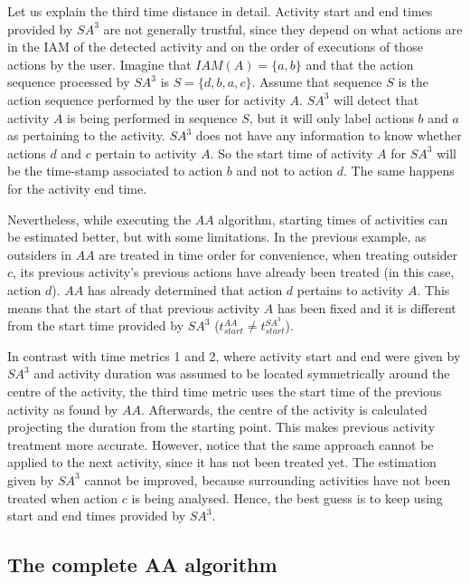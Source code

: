 Let us explain the third time distance in detail. Activity start and end times provided by $SA^3$ are not generally trustful, since they depend on what actions are in the IAM of the detected activity and on the order of executions of those actions by the user. Imagine that $IAM(A)=\{a, b\}$ and that the action sequence processed by $SA^3$ is $S=\{d, b, a, c\}$. Assume that sequence $S$ is the action sequence performed by the user for activity $A$. $SA^3$ will detect that activity $A$ is being performed in sequence $S$, but it will only label actions $b$ and $a$ as pertaining to the activity. $SA^3$ does not have any information to know whether actions $d$ and $c$ pertain to activity $A$. So the start time of activity $A$ for $SA^3$ will be the time-stamp associated to action $b$ and not to action $d$. The same happens for the activity end time.

Nevertheless, while executing the $AA$ algorithm, starting times of activities can be estimated better, but with some limitations. In the previous example, as outsiders in $AA$ are treated in time order for convenience, when treating outsider $c$, its previous activity's previous actions have already been treated (in this case, action $d$). $AA$ has already determined that action $d$ pertains to activity $A$. This means that the start of that previous activity $A$ has been fixed and it is different from the start time provided by $SA^3$ ($t_{start} ^{AA} \neq t_{start} ^{SA^3}$).

In contrast with time metrics 1 and 2, where activity start and end were given by $SA^3$ and activity duration was assumed to be located symmetrically around the centre of the activity, the third time metric uses the start time of the previous activity as found by $AA$. Afterwards, the centre of the activity is calculated projecting the duration from the starting point. This makes previous activity treatment more accurate. However, notice that the same approach cannot be applied to the next activity, since it has not been treated yet. The estimation given by $SA^3$ cannot be improved, because surrounding activities have not been treated when action $c$ is being analysed. Hence, the best guess is to keep using start and end times provided by $SA^3$.

\subsection{The complete AA algorithm}
\label{subsec:clustering:complete-ac}

